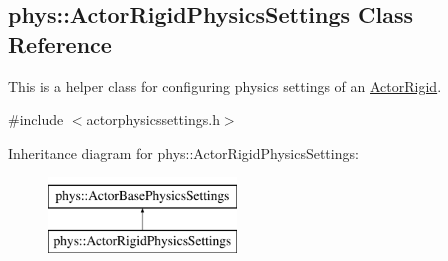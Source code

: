 \hypertarget{classphys_1_1ActorRigidPhysicsSettings}{
\subsection{phys::ActorRigidPhysicsSettings Class Reference}
\label{classphys_1_1ActorRigidPhysicsSettings}
}


This is a helper class for configuring physics settings of an \hyperlink{classphys_1_1ActorRigid}{ActorRigid}.  




{\ttfamily \#include $<$actorphysicssettings.h$>$}

Inheritance diagram for phys::ActorRigidPhysicsSettings:\begin{figure}[H]
\begin{center}
\leavevmode
\includegraphics[height=2.000000cm]{classphys_1_1ActorRigidPhysicsSettings}
\end{center}
\end{figure}
